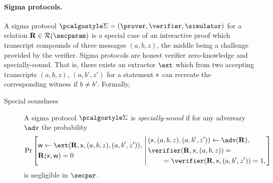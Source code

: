 \let\accentvec\vec \documentclass[runningheads,10pt]{llncs}
\begin{document}
\paragraph{Sigma protocols.}
A sigma protocol $\sigmaprot = (\prover, \verifier, \simulator)$  for a relation
$\REL \in \RELGEN(\secparam)$  is a special case of an interactive proof which transcript compounds of three messages $(a, b, z)$, the middle being a challenge provided by the verifier.
Sigma protocols are honest verifier zero-knowledge and specially-sound. That is, there exists an extractor $\ext$ which from two accepting transcripts $(a, b, z)$, $(a, b', z')$ for a statement $\mathsf{x}$ can recreate the corresponding witness if $b \neq b'$. Formally,
\begin{description}
	\item[Special soundness] A sigma protocol $\sigmaprot$ is \emph{specially-sound} if for any adversary $\adv$ the probability
	\[
		\Pr\left[
		\begin{aligned}
				& \wit \gets \ext(\REL, \inp, (a, b, z), (a, b', z')),\\
				& \REL(\inp, \wit) = 0
		\end{aligned}
		\,\left|\,
		\begin{aligned}
			& (\inp, (a, b, z), (a, b', z')) \gets \adv(\REL), \\
			& \verifier(\REL, \inp, (a, b, z)) = \\
			& \qquad = \verifier(\REL, \inp, (a, b', z')) = 1, \\
		\end{aligned}
		\right.\right]
	\]
	is negligible in $\secpar$.
\end{description}

\end{document}

